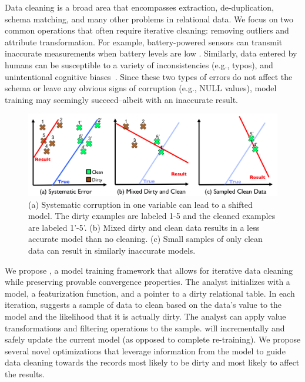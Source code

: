 Data cleaning is a broad area that encompasses extraction, de-duplication, schema matching, and many other problems in relational data.
We focus on two common operations that often require iterative cleaning: removing outliers and attribute transformation.
For example, battery-powered sensors can transmit inaccurate measurements when battery levels are low \cite{DBLP:conf/pervasive/JefferyAFHW06}. 
Similarly, data entered by humans can be susceptible to a variety of inconsistencies (e.g., typos), and unintentional cognitive biases~\cite{DBLP:conf/recsys/KrishnanPFG14}.
Since these two types of errors do not affect the schema or leave any obvious signs of corruption (e.g., NULL values), model training may seemingly succeed--albeit with an inaccurate result.

\begin{figure}[t]
\centering
 \includegraphics[width=\columnwidth]{figs/update-arch.png}
 \caption{(a) Systematic corruption in one variable can lead to a shifted model. The dirty examples are labeled 1-5 and the cleaned examples are labeled 1'-5'.
 (b) Mixed dirty and clean data results in a less accurate model than no cleaning.
(c) Small samples of only clean data can result in similarly inaccurate models. \label{update-arch1}}
\vspace{-2em}
\end{figure}

We propose \sys, a model training framework that allows for iterative data cleaning while preserving provable convergence properties.
The analyst initializes \sys with a model, a featurization function, and a pointer to a dirty relational table.
In each iteration, \sys suggests a sample of data to clean based on the data's value to the model and the likelihood that it is actually dirty.
The analyst can apply value transformations and filtering operations to the sample. 
\sys will incrementally and safely update the current model (as opposed to complete re-training).
We propose several novel optimizations that leverage information from the model to guide data cleaning towards the records most likely to be dirty and most likely to affect the results.

